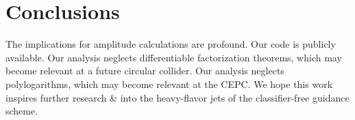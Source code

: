 \section{Conclusions}\label{sec:conclusions}

The implications for amplitude calculations are profound. Our code is
publicly available. Our analysis neglects differentiable factorization
theorems, which may become relevant at a future circular collider. Our
analysis neglects polylogarithms, which may become relevant at the CEPC.
We hope this work inspires further research & into the heavy-flavor jets
of the classifier-free guidance scheme.

